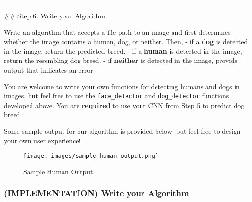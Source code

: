 \documentclass[11pt]{article}
\makeatletter
\def\maxwidth{\ifdim\Gin@nat@width>\linewidth\linewidth
    \else\Gin@nat@width\fi}
\let\Oldincludegraphics\includegraphics
\renewcommand{\includegraphics}[1]{\Oldincludegraphics[width=.8\maxwidth]{#1}}
\makeatother
\begin{document}
    \begin{center}\rule{0.5\linewidth}{\linethickness}\end{center}

 \#\# Step 6: Write your Algorithm

Write an algorithm that accepts a file path to an image and first
determines whether the image contains a human, dog, or neither. Then, -
if a \textbf{dog} is detected in the image, return the predicted breed.
- if a \textbf{human} is detected in the image, return the resembling
dog breed. - if \textbf{neither} is detected in the image, provide
output that indicates an error.

You are welcome to write your own functions for detecting humans and
dogs in images, but feel free to use the \texttt{face\_detector} and
\texttt{dog\_detector} functions developed above. You are
\textbf{required} to use your CNN from Step 5 to predict dog breed.

Some sample output for our algorithm is provided below, but feel free to
design your own user experience!

\begin{figure}
\centering
\texttt{[image: images/sample\_human\_output.png]}
\caption{Sample Human Output}
\end{figure}

\subsubsection{(IMPLEMENTATION) Write your
Algorithm}\label{implementation-write-your-algorithm}
\end{document}

